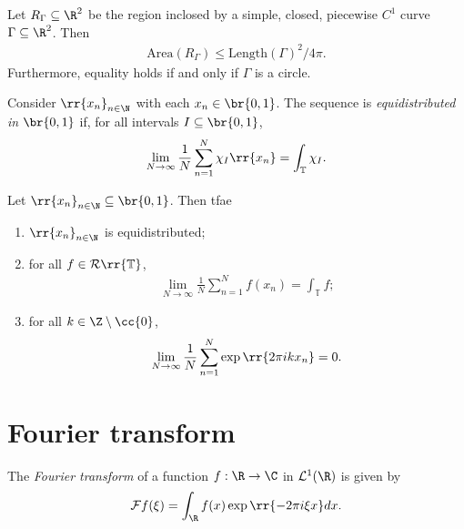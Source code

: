 \documentclass{article}
\begin{document}
\begin{theorem}
  Let $R_\Gamma\subseteq\R^2$ be the region inclosed by a simple,
  closed, piecewise $C^1$ curve $\Gamma\subseteq\R^2$. Then
  \begin{align*}
    \text{Area}(R_\Gamma) \leq \text{Length}(\Gamma)^2 / 4\pi.
  \end{align*}
  Furthermore, equality holds if and only if $\Gamma$ is a circle.
\end{theorem}

\begin{definition}
  Consider $\rr{x_n}_{n\in\N}$ with each $x_n\in\br{0,1}$. The sequence is \emph{equidistributed
  in $\br{0,1}$} if, for all intervals $I\subseteq \br{0,1}$,
  \begin{align*}
    \lim_{N\to\infty} \frac{1}{N}\sum_{n=1}^N \chi_I\rr{x_n} = \int_{\mathbb T}\chi_I.
  \end{align*}
\end{definition}

\begin{theorem}
  Let $\rr{x_n}_{n\in\N}\subseteq\br{0,1}$. Then tfae
  \begin{enumerate}
    \item $\rr{x_n}_{n\in\N}$ is equidistributed;
    \item for all $f\in\mathcal R\rr{\mathbb T}$,
      \begin{align*}
        \lim_{N\to\infty}\frac{1}{N}\sum_{n=1}^N f(x_n) = \int_{\mathbb T} f;
      \end{align*}
    \item for all $k\in\Z\setminus\cc{0}$,
      \begin{align*}
        \lim_{N\to\infty} \frac{1}{N}\sum_{n=1}^{N} \exp\rr{2\pi ikx_n}=0.
      \end{align*}
  \end{enumerate}
\end{theorem}

\section{Fourier transform}

\begin{definition}
  The \emph{Fourier transform} of a function $f:\R\to\C$ in
  $\mathcal L^1(\R)$ is given by
  \begin{align*}
    \mathcal Ff(\xi) = \int_{\R} f(x) \exp\rr{-2\pi i\xi x} dx.
  \end{align*}
\end{definition}
\end{document}
